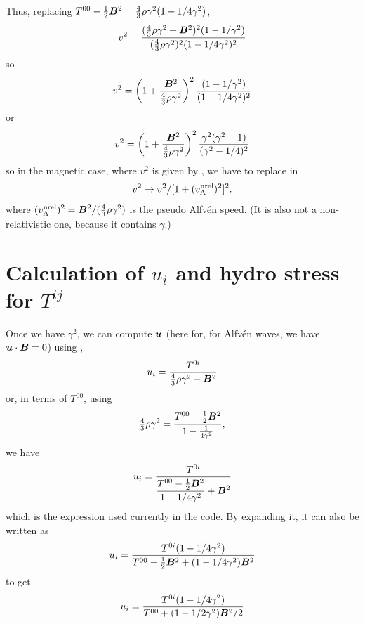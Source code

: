 \documentclass[twocolumn]{article}
\begin{document}
Thus, replacing $T^{00}-{\textstyle{1\over2}}\bm{B}^2={\textstyle{4\over3}}\rho\gamma^2(1-1/4\gamma^2)$,
\begin{equation}
v^2=\frac{({\textstyle{4\over3}}\rho\gamma^2+\bm{B}^2)^2(1-1/\gamma^2)}
{({\textstyle{4\over3}}\rho\gamma^2)^2(1-1/4\gamma^2)^2}
\end{equation}
so
\begin{equation}
v^2=\left(1+\frac{\bm{B}^2}{{\textstyle{4\over3}}\rho\gamma^2}\right)^2
\frac{(1-1/\gamma^2)}
{(1-1/4\gamma^2)^2}
\end{equation}
or
\begin{equation}
v^2=\left(1+\frac{\bm{B}^2}{{\textstyle{4\over3}}\rho\gamma^2}\right)^2
\frac{\gamma^2(\gamma^2-1)}
{(\gamma^2-1/4)^2}
\end{equation}
so in the magnetic case, where $v^2$ is given by ,
we have to replace in 
\begin{equation}
v^2\to v^2/[1+(v_{\rm A}^{\rm nrel})^2]^2.
\end{equation}
where $(v_{\rm A}^{\rm nrel})^2=\bm{B}^2/({\textstyle{4\over3}}\rho\gamma^2)$
is the pseudo Alfv\'en speed.
(It is also {\rm not} a non-relativistic one, because it contains $\gamma$.)

\section{Calculation of $u_i$ and hydro stress for $T^{ij}$}

Once we have $\gamma^2$, we can compute $\bm{u}$ (here for, for Alfv\'en waves,
we have $\bm{u}\cdot\bm{B}=0$) using ,
\begin{equation}
u_i=\frac{T^{0i}}{{\textstyle{4\over3}}\rho\gamma^2+\bm{B}^2}
\end{equation}
or, in terms of $T^{00}$, using
\begin{equation}
{\textstyle{4\over3}}\rho\gamma^2=\frac{T^{00}-{\textstyle{1\over2}}\bm{B}^2}{1-\frac{1}{4\gamma^2}},
\end{equation}
we have
\begin{equation}
u_i=\frac{T^{0i}}{\displaystyle{\frac{T^{00}-{\textstyle{1\over2}}\bm{B}^2}{1-1/4\gamma^2}}+\bm{B}^2}
\end{equation}
which is the expression used currently in the code.
By expanding it, it can also be written as
\begin{equation}
u_i=\frac{T^{0i}(1-1/4\gamma^2)}{T^{00}-{\textstyle{1\over2}}\bm{B}^2+(1-1/4\gamma^2)\bm{B}^2}
\end{equation}
to get
\begin{equation}
u_i=\frac{T^{0i}(1-1/4\gamma^2)}{T^{00}+(1-1/2\gamma^2)\bm{B}^2/2}
\end{equation}
\end{document}
